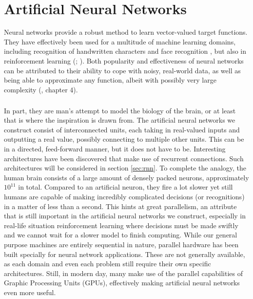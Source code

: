 \chapter{Artificial Neural Networks}
Neural networks provide a robust method to learn
vector-valued target functions.
They have effectively been used for a multitude of machine learning domains,
including recognition of handwritten characters
\parencite{LeCun1989}
and
face recognition
\parencite{Cottreil1991},
but also in reinforcement learning
(\cite{anderson1989}; \cite{lin1993}). %
Both popularity and effectiveness of neural networks can be attributed to
their ability to cope with noisy, real-world data,
as well as being able to approximate any function,
albeit with possibly very large complexity
(\cite{mitchell1997}, chapter 4).

\paragraph{}
In part, they are man's attempt
to model the biology of the brain,
or at least that is where the inspiration is drawn from.
The artificial neural networks we construct
consist of interconnected units,
each taking in real-valued inputs
and outputting a real value,
possibly connecting to multiple other units.
This can be in a directed, feed-forward manner,
but it does not have to be.
Interesting architectures have been discovered
that make use of recurrent connections.
Such architectures will be considered in
section \ref{sec:rnn}.
To complete the analogy,
the human brain consists of a large amount of densely packed neurons,
approximately $10^{11}$ in total.
Compared to an artificial neuron,
they fire a lot slower
yet still humans are capable of
making incredibly complicated decisions
(or recognitions)
in a matter of less than a second.
This hints at great parallelism,
an attribute that is still important
in the artificial neural networks we construct,
especially in real-life situation reinforcement learning
where decisions must be made swiftly and we cannot wait
for a slower model to finish computing.
While our general purpose machines
are entirely sequential in nature,
parallel hardware has been built specially
for neural network applications.
These are not generally available,
as each domain and even each problem
still require their own specific architectures.
Still, in modern day, many make use
of the parallel capabilities of
Graphic Processing Units (GPUs),
effectively making artificial neural networks even more useful.

